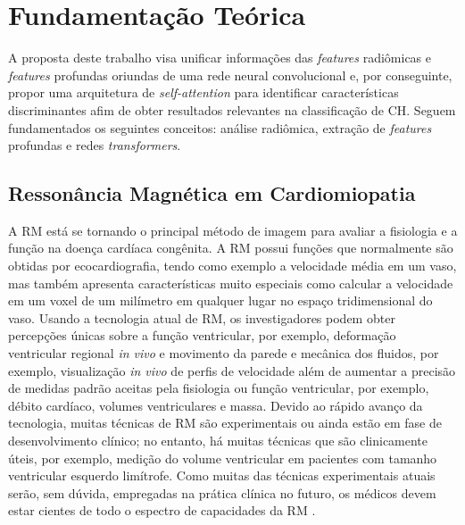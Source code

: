 \chapter{Fundamentação Teórica}
\label{chap:fundamentacao_teorica}

A proposta deste trabalho visa unificar informações das \textit{features} radiômicas e \textit{features} profundas oriundas de uma rede neural convolucional e, por conseguinte, propor uma arquitetura de \textit{self-attention} para identificar características discriminantes afim de obter resultados relevantes na classificação de \gls{CH}. Seguem fundamentados os seguintes conceitos: análise radiômica, extração de \textit{features} profundas e redes \textit{transformers}.

\section{Ressonância Magnética em Cardiomiopatia}

A \gls{RM} está se tornando o principal método de imagem para avaliar a fisiologia e a função na doença cardíaca congênita. A \gls{RM} possui funções que normalmente são obtidas por ecocardiografia, tendo como exemplo a velocidade média em um vaso, mas também apresenta características muito especiais como calcular a velocidade em um voxel de um milímetro em qualquer lugar no espaço tridimensional do vaso.
Usando a tecnologia atual de \gls{RM}, os investigadores podem obter percepções únicas sobre a função ventricular, por exemplo, deformação ventricular regional \textit{in vivo} e movimento da parede e mecânica dos fluidos, por exemplo, visualização \textit{in vivo} de perfis de velocidade além de aumentar a precisão de medidas padrão aceitas pela fisiologia ou função ventricular, por exemplo, débito cardíaco, volumes ventriculares e massa. Devido ao rápido avanço da tecnologia, muitas técnicas de \gls{RM} são experimentais ou ainda estão em fase de desenvolvimento clínico; no entanto, há muitas técnicas que são clinicamente úteis, por exemplo, medição do volume ventricular em pacientes com tamanho ventricular esquerdo limítrofe. Como muitas das técnicas experimentais atuais serão, sem dúvida, empregadas na prática clínica no futuro, os médicos devem estar cientes de todo o espectro de capacidades da \gls{RM} \cite{fogelAssessmentCardiacFunction2000}.

